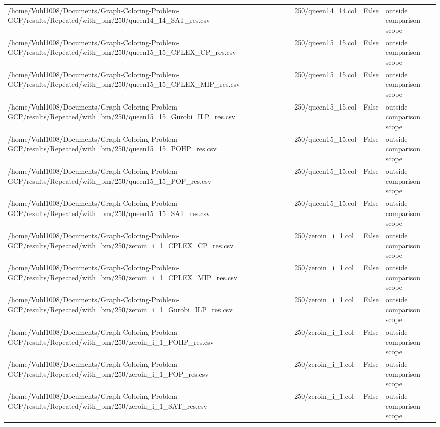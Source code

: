 \begin{table}[htbp]
\begin{tabular}{llll}
/home/Vuhl1008/Documents/Graph-Coloring-Problem-GCP/results/Repeated/with\_bm/250/queen14\_14\_SAT\_res.csv & 250/queen14\_14.col & False & outside comparison scope \\
/home/Vuhl1008/Documents/Graph-Coloring-Problem-GCP/results/Repeated/with\_bm/250/queen15\_15\_CPLEX\_CP\_res.csv & 250/queen15\_15.col & False & outside comparison scope \\
/home/Vuhl1008/Documents/Graph-Coloring-Problem-GCP/results/Repeated/with\_bm/250/queen15\_15\_CPLEX\_MIP\_res.csv & 250/queen15\_15.col & False & outside comparison scope \\
/home/Vuhl1008/Documents/Graph-Coloring-Problem-GCP/results/Repeated/with\_bm/250/queen15\_15\_Gurobi\_ILP\_res.csv & 250/queen15\_15.col & False & outside comparison scope \\
/home/Vuhl1008/Documents/Graph-Coloring-Problem-GCP/results/Repeated/with\_bm/250/queen15\_15\_POHP\_res.csv & 250/queen15\_15.col & False & outside comparison scope \\
/home/Vuhl1008/Documents/Graph-Coloring-Problem-GCP/results/Repeated/with\_bm/250/queen15\_15\_POP\_res.csv & 250/queen15\_15.col & False & outside comparison scope \\
/home/Vuhl1008/Documents/Graph-Coloring-Problem-GCP/results/Repeated/with\_bm/250/queen15\_15\_SAT\_res.csv & 250/queen15\_15.col & False & outside comparison scope \\
/home/Vuhl1008/Documents/Graph-Coloring-Problem-GCP/results/Repeated/with\_bm/250/zeroin\_i\_1\_CPLEX\_CP\_res.csv & 250/zeroin\_i\_1.col & False & outside comparison scope \\
/home/Vuhl1008/Documents/Graph-Coloring-Problem-GCP/results/Repeated/with\_bm/250/zeroin\_i\_1\_CPLEX\_MIP\_res.csv & 250/zeroin\_i\_1.col & False & outside comparison scope \\
/home/Vuhl1008/Documents/Graph-Coloring-Problem-GCP/results/Repeated/with\_bm/250/zeroin\_i\_1\_Gurobi\_ILP\_res.csv & 250/zeroin\_i\_1.col & False & outside comparison scope \\
/home/Vuhl1008/Documents/Graph-Coloring-Problem-GCP/results/Repeated/with\_bm/250/zeroin\_i\_1\_POHP\_res.csv & 250/zeroin\_i\_1.col & False & outside comparison scope \\
/home/Vuhl1008/Documents/Graph-Coloring-Problem-GCP/results/Repeated/with\_bm/250/zeroin\_i\_1\_POP\_res.csv & 250/zeroin\_i\_1.col & False & outside comparison scope \\
/home/Vuhl1008/Documents/Graph-Coloring-Problem-GCP/results/Repeated/with\_bm/250/zeroin\_i\_1\_SAT\_res.csv & 250/zeroin\_i\_1.col & False & outside comparison scope \\

\end{tabular}
\end{table}
